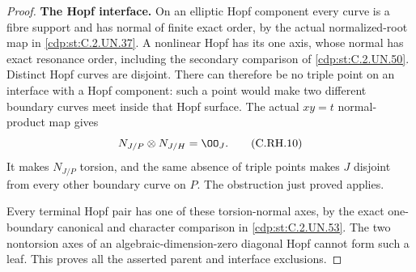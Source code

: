 \begin{proof}
\par\medskip\noindent\textbf{The Hopf interface.}
On an elliptic Hopf
component every curve
is a fibre support and
has normal of finite
exact order, by the
actual normalized-root
map in \ref{cdp:st:C.2.UN.37}. A nonlinear
Hopf has its one axis,
whose normal has exact
resonance order, including
the secondary comparison
of \ref{cdp:st:C.2.UN.50}. Distinct Hopf
curves are disjoint.
There can therefore be
no triple point on an
interface with a Hopf
component: such a point
would make two different
boundary curves meet
inside that Hopf surface.
The actual \(xy=t\)
normal-product map gives
\[
                     N_{J/P}\otimes N_{J/H}=\OO_J.
 \tag{C.RH.10}\label{cdp:eq:C.RH.10}
\]
It makes \(N_{J/P}\)
torsion, and the same
absence of triple points
makes \(J\) disjoint
from every other
boundary curve on \(P\).
The obstruction just
proved applies.

Every terminal Hopf
pair has one of these
torsion-normal axes,
by the exact
one-boundary canonical
and character comparison
in \ref{cdp:st:C.2.UN.53}. The two
nontorsion axes of
an algebraic-dimension-zero
diagonal Hopf cannot
form such a leaf.
This proves all the
asserted parent and
interface exclusions.
\end{proof}


